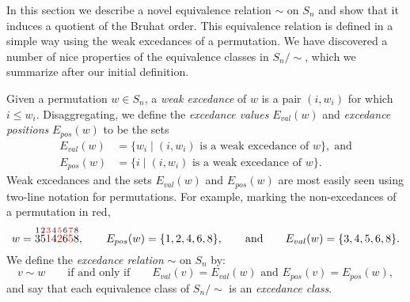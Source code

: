 \documentclass[12pt]{amsart}
\theoremstyle{definition}
\theoremstyle{remark}
\numberwithin{equation}{section}
\newcommand{\QSV}{\mathrm{QSV}}
\newcommand{\EP}{E_{pos}}
\newcommand{\EV}{E_{val}}
\begin{document}
In this section we describe a novel equivalence relation $\sim$ on $S_{n}$ and show that it induces a quotient of the Bruhat order.  
This equivalence relation is defined in a simple way using the weak excedances of a permutation.  
We have discovered a number of nice properties of the equivalence classes in $S_{n}\big/\!\!\sim$, which we summarize after our initial definition.

%
%
%

Given a permutation $w \in S_{n}$, a \emph{weak excedance} of $w$ is a pair $(i, w_{i})$ for which $i \le w_{i}$.  Disaggregating, we define the \emph{excedance values} $\EV(w)$ and \emph{excedance positions} $\EP(w)$ to be the sets
\begin{align*}
\EV(w) &= \{ w_{i} \;|\; \text{$(i, w_{i})$ is a weak excedance of $w$}\},\;\text{and} \\[0.5em]
\EP(w) &= \{ i  \;|\; \text{$(i, w_{i})$ is a weak excedance of $w$}\}.
\end{align*}
Weak excedances and the sets $\EV(w)$ and $\EP(w)$ are most easily seen using two-line notation for permutations.  For example, marking the non-excedances of a permutation in red,
\[
w = \overset{1}{3} \overset{2}{5} {\color{red} \overset{3}{1}} \overset{4}{4} {\color{red} \overset{5}{2}} \overset{6}{6} {\color{red} \overset{7}{5}} \overset{8}{8},
\qquad
\EP(w) = \{1, 2, 4, 6, 8\},\qquad\text{and}\qquad
\EV(w) = \{3, 4, 5, 6, 8\}.
\]
We define the \emph{excedance relation} $\sim$ on $S_{n}$ by:
\begin{equation}
\label{eq:excednacerel}
v \sim w \qquad\text{if and only if} \qquad \text{$\EV(v) = \EV(w)$ and $\EP(v) = \EP(w)$},
\end{equation}
and say that each equivalence class of $S_{n}\big/\!\!\sim$ is an \emph{excedance class}.
\end{document}
